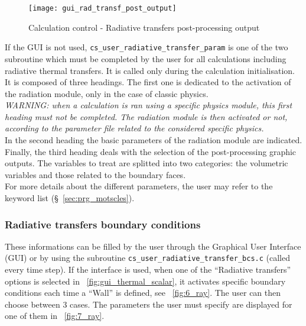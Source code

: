 {{{\begin{figure}[ht]
\begin{center}
\texttt{[image: gui\_rad\_transf\_post\_output]}
\caption{Calculation control - Radiative transfers post-processing output}
\label{fig:5_ray}
\end{center}
\end{figure}

If the GUI is not used, \texttt{cs\_user\_radiative\_transfer\_param} is one of the two subroutine which must be completed by the user for all
calculations including radiative thermal transfers. It is called only during the calculation initialisation. It is composed of three headings. The first one is dedicated to the activation
of the radiation module, only in the case of classic physics. \\
{\em WARNING: when a calculation is ran using a specific physics module,
this first heading must not be completed. The radiation module is then
activated or not, according to the parameter file related to the considered
specific physics.} \\

\noindent
In the second heading the basic parameters of the radiation module are indicated.\\
Finally, the third heading deals with the selection of the
post-processing graphic outputs. The variables to treat are splitted
into two categories: the volumetric variables and those related to the
boundary faces.\\

\noindent
For more details about the different parameters, the user may refer to the
keyword list (\S~\ref{sec:prg_motscles}).


\subsubsection{Radiative transfers boundary conditions}
These informations can be filled by the user through the Graphical User Interface
(GUI) or by using the subroutine \texttt{cs\_user\_radiative\_transfer\_bcs.c} (called every time step). If the
interface is used, when one of the ``Radiative transfers'' options is selected in
\figurename~\ref{fig:gui_thermal_scalar}, it activates specific boundary conditions each time
a ``Wall'' is defined, see \figurename~\ref{fig:6_ray}. The user can then choose
between 3 cases. The parameters the user must specify are displayed for one of
them in \figurename~\ref{fig:7_ray}.

}}}
